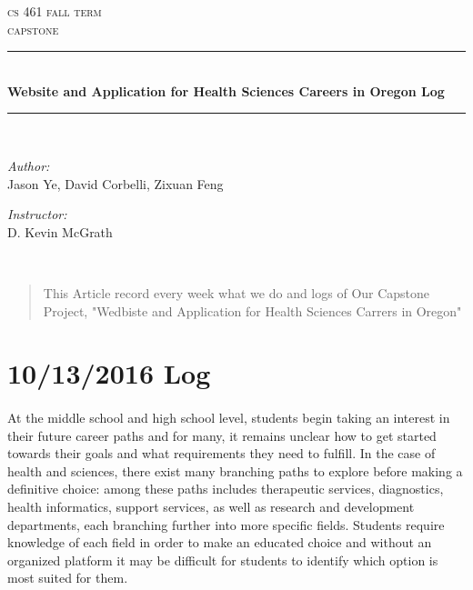 \documentclass[letterpaper,10pt]{article}
\begin{document}
    \begin{titlepage}
    \newcommand{\HRule}{\rule{\linewidth}{0.5mm}}
    \center 
    \textsc{\Large cs 461 fall term}\\[0.5cm] 
    \textsc{\Large capstone}\\[0.5cm] 
    \HRule \\[0.4cm]
    { \huge \bfseries Website and Application for Health Sciences Careers in Oregon  Log}\\[0.5cm] %
    \HRule \\[1.5cm]
    \begin{minipage}{0.4\textwidth}
        \begin{flushleft} \large
        \emph{Author:}\\
          Jason Ye, David Corbelli, Zixuan Feng
        \end{flushleft}
    \end{minipage}
    \begin{minipage}{0.4\textwidth}
        \begin{flushright} \large
        \emph{Instructor:} \\
        D. Kevin McGrath
        \end{flushright}
    \end{minipage}\\[2cm]
    \begin{abstract}
This Article record every week what we do and logs of Our Capstone Project, "Wedbiste and Application for Health Sciences Carrers in Oregon"
	\end{abstract}


    \end{titlepage}
    


  \section {10/13/2016 Log}	
    \paragraph {}
At the middle school and high school level, students begin taking an interest in their future career paths and for many, it remains unclear how to get started towards their goals and what requirements they need to fulfill. In the case of health and sciences, there exist many branching paths to explore before making a definitive choice: among these paths includes therapeutic services, diagnostics, health informatics, support services, as well as research and development departments, each branching further into more specific fields. Students require knowledge of each field in order to make an educated choice and without an organized platform it may be difficult for students to identify which option is most suited for them. 



        


    
\end{document}
